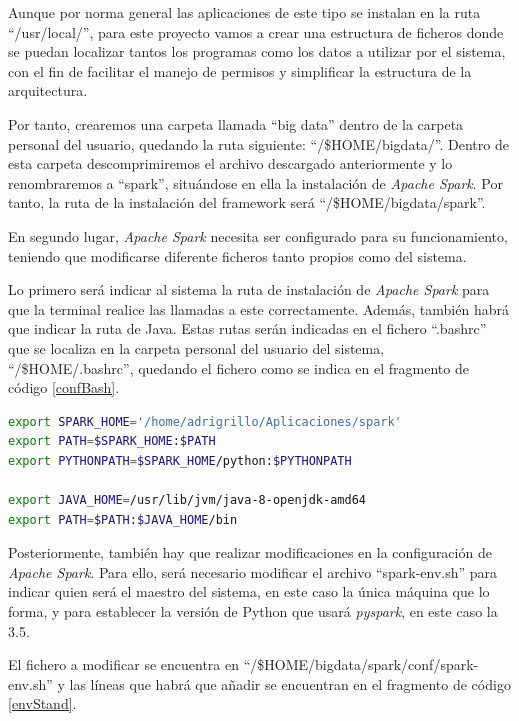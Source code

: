 Aunque por norma general las aplicaciones de este tipo se instalan en la ruta ``/usr/local/'', para este proyecto vamos a crear una estructura de ficheros donde se puedan localizar tantos los programas como los datos a utilizar por el sistema, con el fin de facilitar el manejo de permisos y simplificar la estructura de la arquitectura.

Por tanto, crearemos una carpeta llamada ``big data'' dentro de la carpeta personal del usuario, quedando la ruta siguiente: ``/\$HOME/bigdata/''. Dentro de esta carpeta descomprimiremos el archivo descargado anteriormente y lo renombraremos a ``spark'', situándose en ella la instalación de \textit{Apache Spark}. Por tanto, la ruta de la instalación del \gls{framework} será ``/\$HOME/bigdata/spark''.

En segundo lugar, \textit{Apache Spark} necesita ser configurado para su funcionamiento, teniendo que modificarse diferente ficheros tanto propios como del sistema. 

Lo primero será indicar al sistema la ruta de instalación de \textit{Apache Spark} para que la terminal realice las llamadas a este correctamente. Además, también habrá que indicar la ruta de Java. Estas rutas serán indicadas en el fichero ``.bashrc'' que se localiza en la carpeta personal del usuario del sistema, ``/\$HOME/.bashrc'', quedando el fichero como se indica en el fragmento de código \ref{confBash}.

\begin{lstlisting}[label=confBash,language=sh,frame=single,caption=Líneas a añadir en el fichero ``.bashrc''' para configurar \textit{Apache Spark}]
export SPARK_HOME='/home/adrigrillo/Aplicaciones/spark'
export PATH=$SPARK_HOME:$PATH
export PYTHONPATH=$SPARK_HOME/python:$PYTHONPATH

export JAVA_HOME=/usr/lib/jvm/java-8-openjdk-amd64
export PATH=$PATH:$JAVA_HOME/bin
\end{lstlisting}

Posteriormente, también hay que realizar modificaciones en la configuración de \textit{Apache Spark}. Para ello, será necesario modificar el archivo ``spark-env.sh'' para indicar quien será el maestro del sistema, en este caso la única máquina que lo forma, y para establecer la versión de Python que usará \textit{pyspark}, en este caso la 3.5.

El fichero a modificar se encuentra en ``/\$HOME/bigdata/spark/conf/spark-env.sh'' y las líneas que habrá que añadir se encuentran en el fragmento de código \ref{envStand}.

